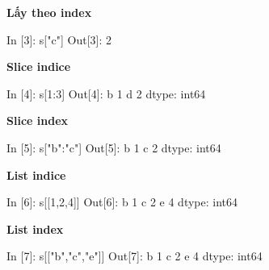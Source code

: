 \documentclass[
]{book}
\newenvironment{Shaded}{\begin{snugshade}}{\end{snugshade}}
\newcommand{\DecValTok}[1]{\textcolor[rgb]{0.00,0.00,0.81}{#1}}
\newcommand{\NormalTok}[1]{#1}
\newcommand{\StringTok}[1]{\textcolor[rgb]{0.31,0.60,0.02}{#1}}
\begin{document}
\textbf{Lấy theo index}

\begin{Shaded}
\begin{Highlighting}[]
\NormalTok{In [}\DecValTok{3}\NormalTok{]: s[}\StringTok{"c"}\NormalTok{]}
\NormalTok{Out[}\DecValTok{3}\NormalTok{]: }\DecValTok{2} 
\end{Highlighting}
\end{Shaded}

\textbf{Slice indice}

\begin{Shaded}
\begin{Highlighting}[]
\NormalTok{In [}\DecValTok{4}\NormalTok{]: s[}\DecValTok{1}\NormalTok{:}\DecValTok{3}\NormalTok{]}
\NormalTok{Out[}\DecValTok{4}\NormalTok{]:}
\NormalTok{b    }\DecValTok{1}
\NormalTok{d    }\DecValTok{2}
\NormalTok{dtype: int64}
\end{Highlighting}
\end{Shaded}

\textbf{Slice index}

\begin{Shaded}
\begin{Highlighting}[]
\NormalTok{In [}\DecValTok{5}\NormalTok{]: s[}\StringTok{"b"}\NormalTok{:}\StringTok{"c"}\NormalTok{]}
\NormalTok{Out[}\DecValTok{5}\NormalTok{]: }
\NormalTok{b    }\DecValTok{1}
\NormalTok{c    }\DecValTok{2}
\NormalTok{dtype: int64}
\end{Highlighting}
\end{Shaded}

\textbf{List indice}

\begin{Shaded}
\begin{Highlighting}[]
\NormalTok{In [}\DecValTok{6}\NormalTok{]: s[[}\DecValTok{1}\NormalTok{,}\DecValTok{2}\NormalTok{,}\DecValTok{4}\NormalTok{]]}
\NormalTok{Out[}\DecValTok{6}\NormalTok{]:}
\NormalTok{b    }\DecValTok{1}
\NormalTok{c    }\DecValTok{2}
\NormalTok{e    }\DecValTok{4}
\NormalTok{dtype: int64}
\end{Highlighting}
\end{Shaded}

\textbf{List index}

\begin{Shaded}
\begin{Highlighting}[]
\NormalTok{In [}\DecValTok{7}\NormalTok{]: s[[}\StringTok{"b"}\NormalTok{,}\StringTok{"c"}\NormalTok{,}\StringTok{"e"}\NormalTok{]]}
\NormalTok{Out[}\DecValTok{7}\NormalTok{]:}
\NormalTok{b    }\DecValTok{1}
\NormalTok{c    }\DecValTok{2}
\NormalTok{e    }\DecValTok{4}
\NormalTok{dtype: int64}
\end{Highlighting}
\end{Shaded}
\end{document}
